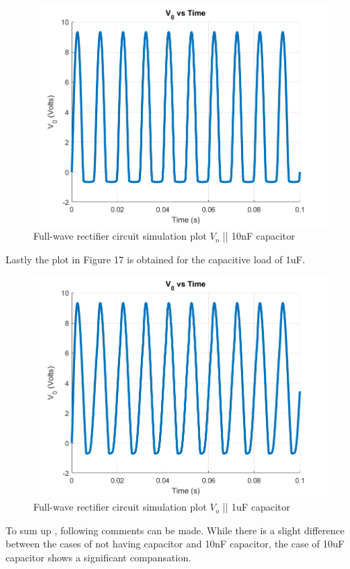 \documentclass[letterpaper,12pt]{article}
\begin{document}
\begin{figure}[H]
    \centering
   \includegraphics[width=1\textwidth]{7_10nF.png}
   \caption{Full-wave rectifier circuit simulation plot \(V_o\) || 10nF capacitor}
\end{figure} 

Lastly the plot in Figure 17 is obtained for the capacitive load of 1uF.

\begin{figure}[H]
    \centering
   \includegraphics[width=1\textwidth]{7_1uF.png}
   \caption{Full-wave rectifier circuit simulation plot \(V_o\) || 1uF capacitor }
\end{figure} 

To sum up , following comments can be made. While there is a slight difference between the cases of not having capacitor and 10nF capacitor, the case of 10uF capacitor shows a significant compansation.
\end{document}

